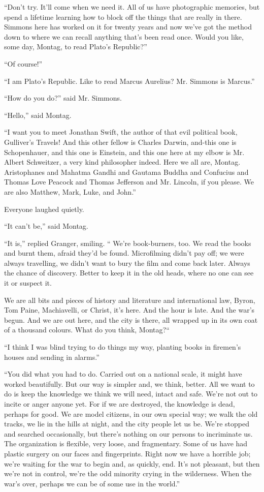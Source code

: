 \documentclass[11pt,openany]{book}
\begin{document}
``Don't try. It'll come when we need it. All of us have photographic memories, but spend a lifetime learning how to block off the things that are really in there. Simmons here has worked on it for twenty years and now we've got the method down to where we can recall anything that's been read once. Would you like, some day, Montag, to read Plato's Republic?''

``Of course!''

``I am Plato's Republic. Like to read Marcus Aurelius? Mr. Simmons is Marcus.''

``How do you do?'' said Mr. Simmons.

``Hello,'' said Montag.

``I want you to meet Jonathan Swift, the author of that evil political book, Gulliver's Travels! And this other fellow is Charles Darwin, and-this one is Schopenhauer, and this one is Einstein, and this one here at my elbow is Mr. Albert Schweitzer, a very kind philosopher indeed. Here we all are, Montag. Aristophanes and Mahatma Gandhi and Gautama Buddha and Confucius and Thomas Love Peacock and Thomas Jefferson and Mr. Lincoln, if you please. We are also Matthew, Mark, Luke, and John.''

Everyone laughed quietly.

``It can't be,'' said Montag.

``It is,'' replied Granger, smiling. `` We're book-burners, too. We read the books and burnt them, afraid they'd be found. Microfilming didn't pay off; we were always travelling, we didn't want to bury the film and come back later. Always the chance of discovery. Better to keep it in the old heads, where no one can see it or suspect it.

We are all bits and pieces of history and literature and international law, Byron, Tom Paine, Machiavelli, or Christ, it's here. And the hour is late. And the war's begun. And we are out here, and the city is there, all wrapped up in its own coat of a thousand colours. What do you think, Montag?``

``I think I was blind trying to do things my way, planting books in firemen's houses and sending in alarms.''

``You did what you had to do. Carried out on a national scale, it might have worked beautifully. But our way is simpler and, we think, better. All we want to do is keep the knowledge we think we will need, intact and safe. We're not out to incite or anger anyone yet. For if we are destroyed, the knowledge is dead, perhaps for good. We are model citizens, in our own special way; we walk the old tracks, we lie in the hills at night, and the city people let us be. We're stopped and searched occasionally, but there's nothing on our persons to incriminate us. The organization is flexible, very loose, and fragmentary. Some of us have had plastic surgery on our faces and fingerprints. Right now we have a horrible job; we're waiting for the war to begin and, as quickly, end. It's not pleasant, but then we're not in control, we're the odd minority crying in the wilderness. When the war's over, perhaps we can be of some use in the world.''
\end{document}
